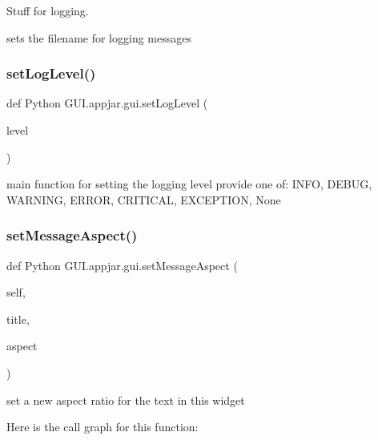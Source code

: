 \begin{DoxyVerb}
Stuff for logging. 

\begin{DoxyVerb}sets the filename for logging messages \end{DoxyVerb}
 \mbox{\label{class_python_01_g_u_i_1_1appjar_1_1gui_a10d4a1980e353cddaf9bc4143929a5fd}} 
\subsubsection{\texorpdfstring{set\+Log\+Level()}{setLogLevel()}}
{\footnotesize\ttfamily def Python G\+U\+I.\+appjar.\+gui.\+set\+Log\+Level (\begin{DoxyParamCaption}\item[{}]{level }\end{DoxyParamCaption})\hspace{0.3cm}{\ttfamily [static]}}

\begin{DoxyVerb}main function for setting the logging level
    provide one of: INFO, DEBUG, WARNING, ERROR, CRITICAL, EXCEPTION, None \end{DoxyVerb}
 \mbox{\label{class_python_01_g_u_i_1_1appjar_1_1gui_a89d1599f7c833480395b1f2556b6c433}} 
\subsubsection{\texorpdfstring{set\+Message\+Aspect()}{setMessageAspect()}}
{\footnotesize\ttfamily def Python G\+U\+I.\+appjar.\+gui.\+set\+Message\+Aspect (\begin{DoxyParamCaption}\item[{}]{self,  }\item[{}]{title,  }\item[{}]{aspect }\end{DoxyParamCaption})}

\begin{DoxyVerb}set a new aspect ratio for the text in this widget \end{DoxyVerb}
 Here is the call graph for this function\+:
\mbox{\label{class_python_01_g_u_i_1_1appjar_1_1gui_ae14addd3d536efda511bd8a7be7be2cd}} 

\end{DoxyVerb}
